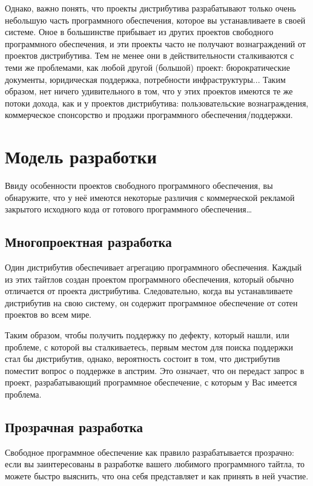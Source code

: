 \documentclass[12pt]{book}
\begin{document}
Однако, важно понять, что проекты дистрибутива  разрабатывают только очень небольшую часть программного обеспечения, которое вы устанавливаете в своей системе. Оное в большинстве прибывает из других проектов свободного программного обеспечения, и эти проекты часто не получают вознаграждений от проектов дистрибутива. Тем не менее они в действительности сталкиваются с теми же проблемами, как любой другой (большой) проект: бюрократические документы, юридическая поддержка, потребности инфраструктуры... Таким образом, нет ничего удивительного в том, что у этих проектов имеются те же потоки дохода, как и у проектов дистрибутива: пользовательские вознаграждения, коммерческое спонсорство и продажи программного обеспечения/поддержки.

\section{Модель разработки}

Ввиду особенности проектов свободного программного обеспечения, вы обнаружите, что у неё имеются некоторые различия с коммерческой рекламой закрытого исходного кода от готового программного обеспечения\ldots

\subsection{Многопроектная разработка}

Один дистрибутив обеспечивает агрегацию программного обеспечения. Каждый из этих тайтлов создан проектом программного обеспечения, который обычно отличается от проекта дистрибутива. Следовательно, когда вы устанавливаете дистрибутив на свою систему, он содержит программное обеспечение от сотен проектов во всем мире.

Таким образом, чтобы получить поддержку по дефекту, который нашли, или проблеме, с которой вы сталкиваетесь, первым местом для поиска поддержки стал бы дистрибутив, однако, вероятность состоит в том, что дистрибутив поместит вопрос о поддержке в апстрим. Это означает, что он передаст запрос в проект, разрабатывающий программное обеспечение, с которым у Вас имеется проблема.

\subsection{Прозрачная разработка}

Свободное программное обеспечение как правило разрабатывается прозрачно: если вы заинтересованы в разработке вашего любимого программного тайтла, то можете быстро выяснить, что она себя представляет и как принять в ней участие.
\end{document}
